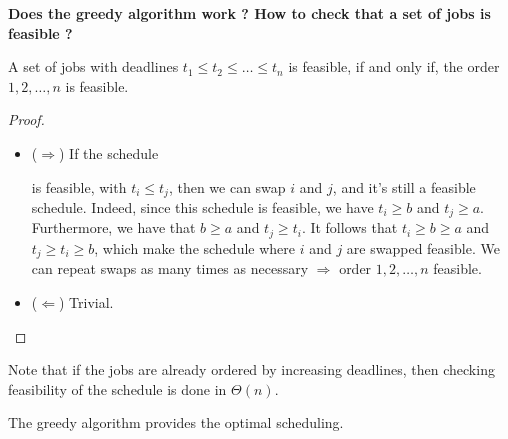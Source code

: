 \textbf{Does the greedy algorithm work ? How to check that a set of jobs is feasible ?}
\begin{theorem}
A set of jobs with deadlines $ t_1 \leq t_2  \leq \hdots \leq t_n $ is feasible, if and only if, the order $1, 2, \ldots, n$ is feasible.
\end{theorem}
\begin{proof} ~

\begin{itemize}
\item ($\Rightarrow$) If the schedule

\begin{figure}[h!]
\centering


\end{figure}
is feasible, with $t_i \leq t_j$, then we can swap $i$ and $j$, and it’s still a feasible schedule. Indeed, since this schedule is feasible, we have $t_i  \geq b$ and $t_j \geq a$. Furthermore, we have that $b \geq a$ and $t_j \geq t_i$. It follows that $t_i \geq b \geq a$ and $t_j \geq t_i \geq b$, which make the schedule where $i$ and $j$ are swapped feasible. We can repeat swaps as many times as necessary $ \Rightarrow$ order $1,2,\hdots, n$ feasible.

\item ($\Leftarrow$) Trivial.

\end{itemize}



\end{proof}

Note that if the jobs are already ordered by increasing deadlines, then checking feasibility of the schedule is done in $\Theta(n)$.

\begin{theorem}
The greedy algorithm provides the optimal scheduling.
\end{theorem}

